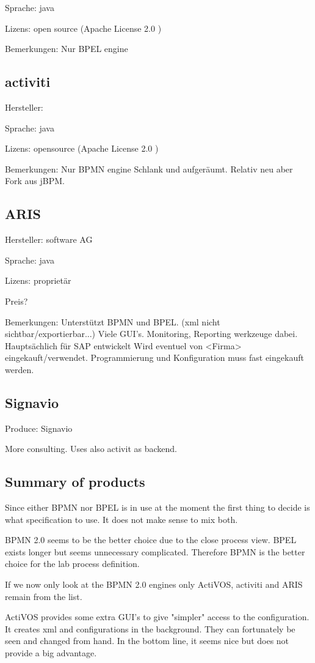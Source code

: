 \documentclass[paper=a4,twoside=false,BCOR=0mm,DIV=calc,fontsize=12pt]{scrartcl}
\begin{document}
Sprache: java

Lizens: open source (Apache License 2.0 )

Bemerkungen:
Nur BPEL engine



\subsection{activiti}
Hersteller:

Sprache: java

Lizens: opensource (Apache License 2.0 )


Bemerkungen:
Nur BPMN engine
Schlank und aufgeräumt. 
Relativ neu aber Fork aus jBPM.


\subsection{ARIS}
Hersteller: software AG

Sprache: java

Lizens: proprietär

Preis?

Bemerkungen:
Unterstützt BPMN und BPEL. (xml nicht sichtbar/exportierbar...)
Viele GUI's. 
Monitoring, Reporting werkzeuge dabei.
Hauptsächlich für SAP entwickelt
Wird eventuel von <Firma> eingekauft/verwendet.
Programmierung und Konfiguration muss fast eingekauft werden.


\subsection{Signavio}
Produce: Signavio

More consulting. Uses also activit as backend.


\subsection{Summary of products}
Since either BPMN nor BPEL is in use at the moment the first thing to decide is what specification to use.
It does not make sense to mix both. 

BPMN 2.0 seems to be the better choice due to the close process view. BPEL exists longer but seems unnecessary complicated.
Therefore BPMN is the better choice for the lab process definition. 

If we now only look at the BPMN 2.0 engines only ActiVOS, activiti and ARIS remain from the list.

ActiVOS provides some extra GUI's to give "simpler" access to the configuration. It creates xml and configurations in the background.
They can fortunately be seen and changed from hand. In the bottom line, it seems nice but does not provide a big advantage. 
\end{document}
